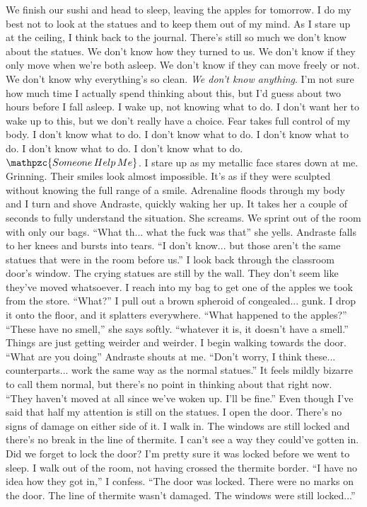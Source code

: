 \documentclass[a4paper, 12pt]{book}
\newcommand\tab[1][1cm]{\hspace*{#1}}
\begin{document}
\newline
\tab
We finish our sushi and head to sleep, leaving the apples for tomorrow. I do my best not to look at the statues and to keep them out of my mind. As I stare up at the ceiling, I think back to the journal. There’s still so much we don’t know about the statues. We don’t know how they turned to us. We don’t know if they only move when we’re both asleep. We don’t know if they can move freely or not. We don’t know why everything’s so clean.  \textit{We don’t know anything}. I’m not sure how much time I actually spend thinking about this, but I’d guess about two hours before I fall asleep. 
\newline
\tab
I wake up, not knowing what to do. I don’t want her to wake up to this, but we don’t really have a choice. Fear takes full control of my body. I don’t know what to do. I don’t know what to do. I don’t know what to do. I don’t know what to do. I don’t know what to do. $\mathpzc{Someone\, Help\, Me}$. I stare up as my metallic face stares down at me. Grinning. Their smiles look almost impossible. It’s as if they were sculpted without knowing the full range of a smile. Adrenaline floods through my body and I turn and shove Andraste, quickly waking her up. It takes her a couple of seconds to fully understand the situation. She screams. We sprint out of the room with only our bags. ``What th... what the fuck was that\textinterrobang'' she yells. Andraste falls to her knees and bursts into tears.
\newline
\tab
``I don’t know... but those aren’t the same statues that were in the room before us.'' I look back through the classroom door’s window. The crying statues are still by the wall. They don’t seem like they’ve moved whatsoever. I reach into my bag to get one of the apples we took from the store. ``What?'' I pull out a brown spheroid of congealed... gunk. I drop it onto the floor, and it splatters everywhere. ``What happened to the apples?''
\newline
\tab
``These have no smell,'' she says softly. ``whatever it is, it doesn’t have a smell.'' Things are just getting weirder and weirder. I begin walking towards the door. ``What are you doing\textinterrobang'' Andraste shouts at me.
\newline
\tab
``Don’t worry, I think these... counterparts... work the same way as the normal statues.'' It feels mildly bizarre to call them normal, but there’s no point in thinking about that right now. ``They haven’t moved at all since we’ve woken up. I’ll be fine.'' Even though I’ve said that half my attention is still on the statues. I open the door. There’s no signs of damage on either side of it. I walk in. The windows are still locked and there’s no break in the line of thermite. I can’t see a way they could’ve gotten in. Did we forget to lock the door? I’m pretty sure it was locked before we went to sleep. I walk out of the room, not having crossed the thermite border. ``I have no idea how they got in,'' I confess. ``The door was locked. There were no marks on the door. The line of thermite wasn’t damaged. The windows were still locked...''
\end{document}
